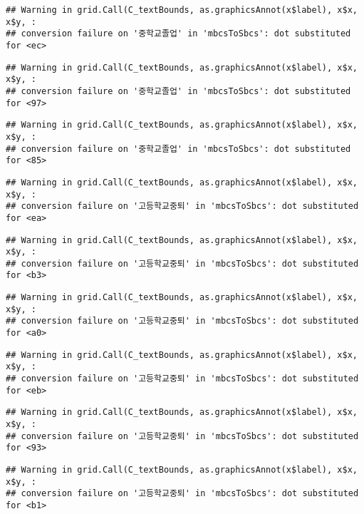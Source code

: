 \documentclass[
]{article}
\begin{document}
\begin{verbatim}
## Warning in grid.Call(C_textBounds, as.graphicsAnnot(x$label), x$x, x$y, :
## conversion failure on '중학교졸업' in 'mbcsToSbcs': dot substituted for <ec>
\end{verbatim}

\begin{verbatim}
## Warning in grid.Call(C_textBounds, as.graphicsAnnot(x$label), x$x, x$y, :
## conversion failure on '중학교졸업' in 'mbcsToSbcs': dot substituted for <97>
\end{verbatim}

\begin{verbatim}
## Warning in grid.Call(C_textBounds, as.graphicsAnnot(x$label), x$x, x$y, :
## conversion failure on '중학교졸업' in 'mbcsToSbcs': dot substituted for <85>
\end{verbatim}

\begin{verbatim}
## Warning in grid.Call(C_textBounds, as.graphicsAnnot(x$label), x$x, x$y, :
## conversion failure on '고등학교중퇴' in 'mbcsToSbcs': dot substituted for <ea>
\end{verbatim}

\begin{verbatim}
## Warning in grid.Call(C_textBounds, as.graphicsAnnot(x$label), x$x, x$y, :
## conversion failure on '고등학교중퇴' in 'mbcsToSbcs': dot substituted for <b3>
\end{verbatim}

\begin{verbatim}
## Warning in grid.Call(C_textBounds, as.graphicsAnnot(x$label), x$x, x$y, :
## conversion failure on '고등학교중퇴' in 'mbcsToSbcs': dot substituted for <a0>
\end{verbatim}

\begin{verbatim}
## Warning in grid.Call(C_textBounds, as.graphicsAnnot(x$label), x$x, x$y, :
## conversion failure on '고등학교중퇴' in 'mbcsToSbcs': dot substituted for <eb>
\end{verbatim}

\begin{verbatim}
## Warning in grid.Call(C_textBounds, as.graphicsAnnot(x$label), x$x, x$y, :
## conversion failure on '고등학교중퇴' in 'mbcsToSbcs': dot substituted for <93>
\end{verbatim}

\begin{verbatim}
## Warning in grid.Call(C_textBounds, as.graphicsAnnot(x$label), x$x, x$y, :
## conversion failure on '고등학교중퇴' in 'mbcsToSbcs': dot substituted for <b1>
\end{verbatim}
\end{document}
